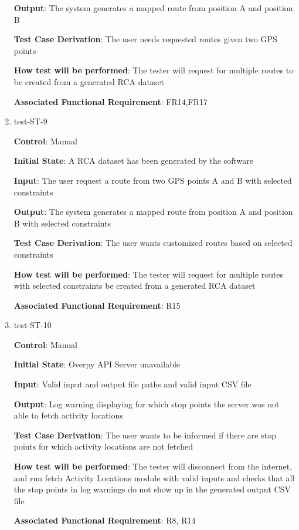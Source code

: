 \documentclass[12pt, titlepage]{article}
\begin{document}
\begin{enumerate}
\textbf{Output}: The system generates a mapped route from position A and position B 

\textbf{Test Case Derivation}: The user needs requested routes given two GPS points

\textbf{How test will be performed}: The tester will request for multiple routes to be created from a generated RCA dataset

\textbf{Associated Functional Requirement}: FR14,FR17

\item{test-ST-9\\}

\textbf{Control}: Manual
					
\textbf{Initial State}: A RCA dataset has been generated by the software
					
\textbf{Input}: The user request a route from two GPS points A and B with selected constraints 
					
\textbf{Output}: The system generates a mapped route from position A and position B with selected constraints

\textbf{Test Case Derivation}: The user wants customized routes based on selected constraints 

\textbf{How test will be performed}: The tester will request for multiple routes with selected constraints be created from a generated RCA dataset

\textbf{Associated Functional Requirement}: R15

\item{test-ST-10\\}

\textbf{Control}: Manual
					
\textbf{Initial State}: Overpy API Server unavailable
					
\textbf{Input}: Valid input and output file paths and valid input CSV
file
					
\textbf{Output}: Log warning displaying for which stop points the server
was not able to fetch activity locations

\textbf{Test Case Derivation}: The user wants to be informed if there are stop points for which activity locations are not fetched

\textbf{How test will be performed}: The tester will disconnect from the internet, and run fetch Activity Locations module with valid inputs and checks that all the stop points in log warnings do not show up in the generated output CSV file

\textbf{Associated Functional Requirement}: R8, R14
\end{enumerate}
\end{document}
